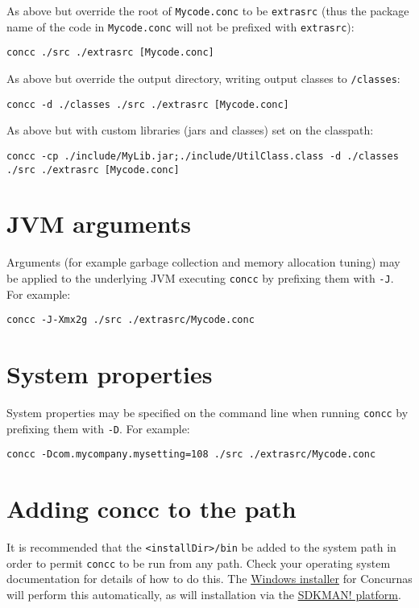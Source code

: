 \documentclass[conc-doc]{subfiles}
\begin{document}
As above but override the root of \lstinline[language=None]{Mycode.conc} to be \lstinline[language=None]{extrasrc} (thus the package name of the code in \lstinline[language=None]{Mycode.conc} will not be prefixed with \lstinline[language=None]{extrasrc}):
\begin{lstlisting}
concc ./src ./extrasrc [Mycode.conc]
\end{lstlisting}

As above but override the output directory, writing output classes to \lstinline[language=None]{/classes}:
\begin{lstlisting}
concc -d ./classes ./src ./extrasrc [Mycode.conc]
\end{lstlisting}

As above but with custom libraries (jars and classes) set on the classpath:
\begin{lstlisting}
concc -cp ./include/MyLib.jar;./include/UtilClass.class -d ./classes ./src ./extrasrc [Mycode.conc]
\end{lstlisting}

\section{JVM arguments}
Arguments (for example garbage collection and memory allocation tuning) may be applied to the underlying JVM executing \lstinline[language=None]{concc} by prefixing them with \lstinline[language=None]{-J}. For example:

\begin{lstlisting}[language=None]
concc -J-Xmx2g ./src ./extrasrc/Mycode.conc
\end{lstlisting}

\section{System properties}
System properties may be specified on the command line when running \lstinline[language=None]{concc} by prefixing them with \lstinline[language=None]{-D}. For example:

\begin{lstlisting}[language=None]
concc -Dcom.mycompany.mysetting=108 ./src ./extrasrc/Mycode.conc
\end{lstlisting}

\section{Adding concc to the path}
It is recommended that the \lstinline[language=None]{<installDir>/bin} be added to the system path in order to permit \lstinline[language=None]{concc} to be run from any path. Check your operating system documentation for details of how to do this. The \href{https://concurnas.com/download.html}{Windows installer} for Concurnas will perform this automatically, as will installation via the \href{https://sdkman.io/sdks#concurnas}{SDKMAN! platform}.
\end{document}
